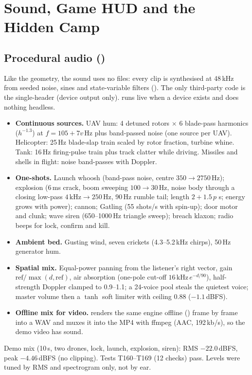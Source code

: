 \section{Sound, Game HUD and the Hidden Camp}\label{sec:v5media}
\subsection{Procedural audio ()}
Like the geometry, the sound uses no files: every clip is synthesised at 48\,kHz from seeded noise, sines and state-variable filters (). The only third-party code is the single-header
 (device output only).  runs live when a device exists and does nothing headless.
\begin{itemize}
  \item \textbf{Continuous sources.} UAV hum: 4 detuned rotors $\times$ 6 blade-pass harmonics ($h^{-1.3}$) at $f=105+7v$\,Hz plus band-passed noise (one source per UAV). Helicopter: 25\,Hz blade-slap train scaled by rotor
  fraction, turbine whine. Tank: 16\,Hz firing-pulse train plus track clatter while driving. Missiles and shells in flight: noise band-passes with Doppler.
  \item \textbf{One-shots.} Launch whoosh (band-pass noise, centre $350\to2750$\,Hz); explosion (6\,ms crack, boom sweeping $100\to30$\,Hz, noise body through a closing low-pass $4\,\text{kHz}\to250$\,Hz, 90\,Hz rumble tail; length $2+1.5\,p$ s; energy grows with power);
  cannon; Gatling (55 shots/s with spin-up); door motor and clunk; wave siren (650--1000\,Hz triangle sweep); breach klaxon; radio beeps for lock, confirm and kill.
  \item \textbf{Ambient bed.} Gusting wind, seven crickets (4.3--5.2\,kHz chirps), 50\,Hz generator hum.
  \item \textbf{Spatial mix.} Equal-power panning from the listener's right vector, gain $\text{ref}/\max(d,\text{ref})$, air absorption (one-pole cut-off $16\,\text{kHz}\,e^{-d/90}$), half-strength Doppler clamped to 0.9--1.1; a 24-voice pool steals the quietest
  voice; master volume then a $\tanh$ soft limiter with ceiling 0.88 ($-1.1$\,dBFS).
  \item \textbf{Offline mix for video.}  renders the same engine offline () frame by frame into a WAV and muxes it into the MP4 with ffmpeg (AAC, 192\,kb/s), so the demo video has sound.
\end{itemize}
Demo mix (10\,s, two drones, lock, launch, explosion, siren): RMS $-22.0$\,dBFS, peak $-4.46$\,dBFS (no clipping). Tests T160--T169 (12 checks) pass. Levels were tuned by RMS and spectrogram only, not by ear.

